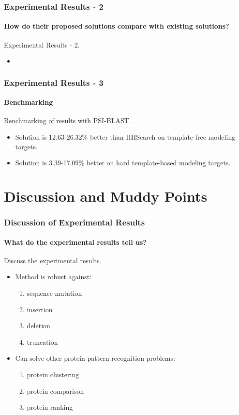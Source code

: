 \documentclass[xcolor={usenames,dvipsnames},hyperref={hyperindex,bookmarks}]{beamer}
\begin{document}
\frame
{
	\frametitle{Experimental Results - 2}
	\framesubtitle{How do their proposed solutions compare with existing solutions?}

	Experimental Results - 2.
	\begin{itemize}
	\item 
	\end{itemize}

}









\frame
{
	\frametitle{Experimental Results - 3}
	\framesubtitle{Benchmarking}

	Benchmarking of results with PSI-BLAST.
	\begin{itemize}
	\item Solution is 12.63-26.32\% better than HHSearch on template-free modeling targets.
	\item Solution is 3.39-17.09\% better on hard template-based modeling targets.
	\end{itemize}

}











\section{Discussion and Muddy Points}


\frame
{
	\frametitle{Discussion of Experimental Results}
	\framesubtitle{What do the experimental results tell us?}

	Discuss the experimental results.
	\begin{itemize}
	\item Method is robust against: 
		\begin{enumerate} 
		\item sequence mutation
		\item insertion
		\item deletion
		\item truncation
		\end{enumerate}
	\item Can solve other protein pattern recognition problems:
		\begin{enumerate} 
		\item protein clustering
		\item protein comparison
		\item protein ranking
		\end{enumerate}
	\end{itemize}

}
\end{document}
